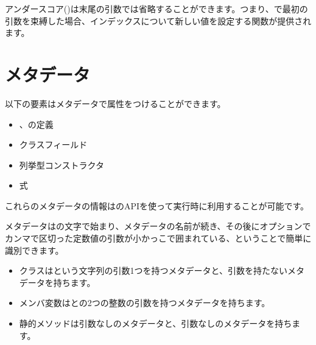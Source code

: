 アンダースコア(\expr{_})は末尾の引数では省略することができます。つまり、で最初の引数を束縛した場合、インデックスについて新しい値を設定する関数が提供されます。


\section{メタデータ}
\label{lf-metadata}

以下の要素はメタデータで属性をつけることができます。

\begin{itemize}
	\item {}、の定義
	\item クラスフィールド
	\item 列挙型コンストラクタ
	\item 式
\end{itemize}

これらのメタデータの情報はのAPIを使って実行時に利用することが可能です。


メタデータはの文字で始まり、メタデータの名前が続き、その後にオプションでカンマで区切った定数値の引数が小かっこで囲まれている、ということで簡単に識別できます。

\begin{itemize}
	\item {}クラスはという文字列の引数1つを持つメタデータと、引数を持たないメタデータを持ちます。
	\item メンバ変数はとの2つの整数の引数を持つメタデータを持ちます。
	\item 静的メソッドは引数なしのメタデータと、引数なしのメタデータを持ちます。
\end{itemize}

